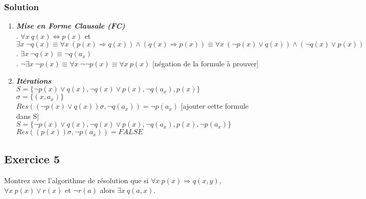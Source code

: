     \subsubsection*{Solution}
    \begin{enumerate}

   \item\textbf{\textit{Mise en Forme Clausale (FC)}} \\
    . $\forall x \ q(x) \Leftrightarrow p(x)$ et $\exists x \ \neg q(x) \equiv \forall x \ (p(x) \Rightarrow q(x)) \land (q(x) \Rightarrow p(x))
     \equiv \forall x \ (\neg p(x) \lor q(x)) \land (\neg q(x) \lor p(x)) $ \\
    . $\exists x \ \neg q(x) \equiv \neg q(a_{x}) $  \\
    . $\neg \exists x \ \neg p(x) \equiv \forall x \ \neg \neg p(x) \equiv \forall x \ p(x) $ [négation de la formule à prouver] \\

    \item \textbf{\textit{Itérations }} \\
    $ S = \{ \neg p(x) \lor q(x) , \neg q(x) \lor p(x) ,  \neg q(a_{x}) , p(x) \}  $ \\
    $ \sigma = \{(x, a_{x}) \} $ \\
    $ Res( (\neg p(x) \lor q(x))\sigma , \neg q(a_{x}) ) = \neg p(a_{x}) $ [ajouter cette formule dans S] \\
    $ S = \{ \neg p(x) \lor q(x) , \neg q(x) \lor p(x) ,  \neg q(a_{x}) , p(x), \neg p(a_{x}) \}$  \\
    $ Res( (p(x))\sigma, \neg p(a_{x}) ) = FALSE $ \\

\end{enumerate}
\subsection*{Exercice 5}
Montrez avec l'algorithme de r\'{e}solution que si $\forall x \ p(x) \Rightarrow q(x, y)$, $\forall x \ p(x) \vee r(x)$ et $\neg r(a)$ alors $\exists x \ q(a, x)$.

